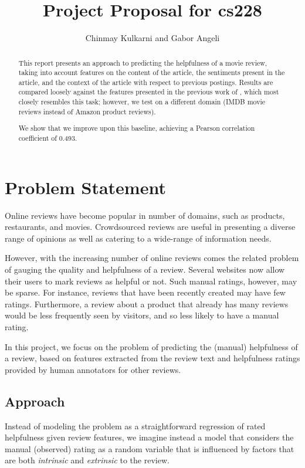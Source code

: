 \documentclass[letter,12pt]{article}
\title{Project Proposal for cs228}
\author{Chinmay Kulkarni and Gabor Angeli}
\begin{document}
\maketitle

\begin{abstract}
This report presents an approach to predicting the helpfulness of a 
	movie review, taking into account features on the content of the article, 
	the sentiments present in the article, and the context of the article
	with respect to previous postings.
Results are compared loosely against the features presented in
	the previous work of 
	, which most closely resembles this task;
	however, we test on a different domain (IMDB movie
	reviews instead of Amazon product reviews).

We show that we improve upon this baseline, achieving a Pearson correlation
	coefficient of 0.493.
\end{abstract}


\section{Problem Statement}
Online reviews have become popular in number of domains, such as products, restaurants, and movies. Crowdsourced reviews are useful in presenting a diverse range of opinions as well as catering to a wide-range of information needs. 

However, with the increasing number of online reviews comes the related problem of gauging the quality and helpfulness of a review. Several websites now allow their users to mark reviews as helpful or not. Such manual ratings, however, may be sparse. For instance, reviews that have been recently created may have few ratings. Furthermore, a review about a product that already has many reviews would be less frequently seen by visitors, and so less likely to have a manual rating.  

In this project, we focus on the problem of predicting the (manual) helpfulness of a review, based on features extracted from the review text and  helpfulness ratings provided by human annotators for other reviews. 


\subsection{Approach}
Instead of modeling the problem as a straightforward regression of rated helpfulness given review features, we imagine instead a model that considers the manual (observed) rating as a random variable that is influenced by factors that are both {\em intrinsic} and {\em extrinsic} to the review. 
\end{document}
